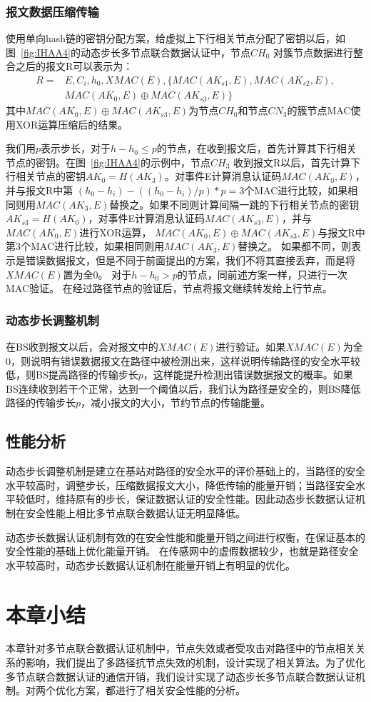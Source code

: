 \subsubsection{报文数据压缩传输}
使用单向hash链的密钥分配方案，给虚拟上下行相关节点分配了密钥以后，如图~\ref{fig:IHAA4}的动态步长多节点联合数据认证中，节点$CH_0$ 对簇节点数据进行整合之后的报文R可以表示为：
\begin{equation}\label{report3}
\begin{split}
  R=
  & E,C_i,h_0,XMAC(E),\{MAC(AK_{s1},E),MAC(AK_{s2},E),\\
  & MAC(AK_0,E)\oplus MAC(AK_{s3},E)\}
\end{split}
\end{equation}
其中$MAC(AK_0,E)\oplus MAC(AK_{s3},E)$为节点$CH_0$和节点$CN_3$的簇节点MAC使用XOR运算压缩后的结果。

我们用$p$表示步长，对于$h-h_0\leq p$的节点，在收到报文后，首先计算其下行相关节点的密钥。在图~\ref{fig:IHAA4}的示例中，节点$CH_3$ 收到报文R以后，首先计算下行相关节点的密钥$AK_0=H(AK_3)$。对事件E计算消息认证码$MAC(AK_0,E)$，并与报文R中第
$(h_0 - h_i)-((h_0 - h_i)/p)\ast p=3$个MAC进行比较，如果相同则用$MAC(AK_3,E)$替换之。如果不同则计算间隔一跳的下行相关节点的密钥$AK_{s3}=H(AK_0)$，对事件E计算消息认证码$MAC(AK_{s3},E)$，并与$MAC(AK_0,E)$进行XOR运算，
$MAC(AK_0,E)\oplus MAC(AK_{s3},E)$与报文R中第3个MAC进行比较，如果相同则用$MAC(AK_3,E)$替换之。
如果都不同，则表示是错误数据报文，但是不同于前面提出的方案，我们不将其直接丢弃，而是将$XMAC(E)$置为全0。
对于$h-h_0> p$的节点，同前述方案一样，只进行一次MAC验证。
在经过路径节点的验证后，节点将报文继续转发给上行节点。

\subsubsection{动态步长调整机制}
在BS收到报文以后，会对报文中的$XMAC(E)$进行验证。如果$XMAC(E)$为全0，则说明有错误数据报文在路径中被检测出来，这样说明传输路径的安全水平较低，则BS提高路径的传输步长$p$，这样能提升检测出错误数据报文的概率。如果BS连续收到若干个正常，达到一个阈值以后，我们认为路径是安全的，则BS降低路径的传输步长$p$，减小报文的大小，节约节点的传输能量。
\subsection{性能分析}
动态步长调整机制是建立在基站对路径的安全水平的评价基础上的，当路径的安全水平较高时，调整步长，压缩数据报文大小，降低传输的能量开销；当路径安全水平较低时，维持原有的步长，保证数据认证的安全性能。因此动态步长数据认证机制在安全性能上相比多节点联合数据认证无明显降低。

动态步长数据认证机制有效的在安全性能和能量开销之间进行权衡，在保证基本的安全性能的基础上优化能量开销。
在传感网中的虚假数据较少，也就是路径安全水平较高时，动态步长数据认证机制在能量开销上有明显的优化。

\section{本章小结}
本章针对多节点联合数据认证机制中，节点失效或者受攻击对路径中的节点相关关系的影响，我们提出了多路径抗节点失效的机制，设计实现了相关算法。为了优化多节点联合数据认证的通信开销，我们设计实现了动态步长多节点联合数据认证机制。对两个优化方案，都进行了相关安全性能的分析。



